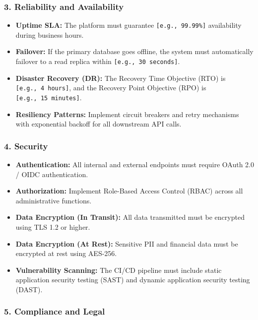 \subsubsection{3. Reliability and
Availability}\label{reliability-and-availability}

\begin{itemize}
\tightlist
\item
  \textbf{Uptime SLA:} The platform must guarantee
  \texttt{{[}e.g.,\ 99.99\%{]}} availability during business hours.
\item
  \textbf{Failover:} If the primary database goes offline, the system
  must automatically failover to a read replica within
  \texttt{{[}e.g.,\ 30\ seconds{]}}.
\item
  \textbf{Disaster Recovery (DR):} The Recovery Time Objective (RTO) is
  \texttt{{[}e.g.,\ 4\ hours{]}}, and the Recovery Point Objective (RPO)
  is \texttt{{[}e.g.,\ 15\ minutes{]}}.
\item
  \textbf{Resiliency Patterns:} Implement circuit breakers and retry
  mechanisms with exponential backoff for all downstream API calls.
\end{itemize}

\subsubsection{4. Security}\label{security}

\begin{itemize}
\tightlist
\item
  \textbf{Authentication:} All internal and external endpoints must
  require OAuth 2.0 / OIDC authentication.
\item
  \textbf{Authorization:} Implement Role-Based Access Control (RBAC)
  across all administrative functions.
\item
  \textbf{Data Encryption (In Transit):} All data transmitted must be
  encrypted using TLS 1.2 or higher.
\item
  \textbf{Data Encryption (At Rest):} Sensitive PII and financial data
  must be encrypted at rest using AES-256.
\item
  \textbf{Vulnerability Scanning:} The CI/CD pipeline must include
  static application security testing (SAST) and dynamic application
  security testing (DAST).
\end{itemize}

\subsubsection{5. Compliance and Legal}\label{compliance-and-legal}

